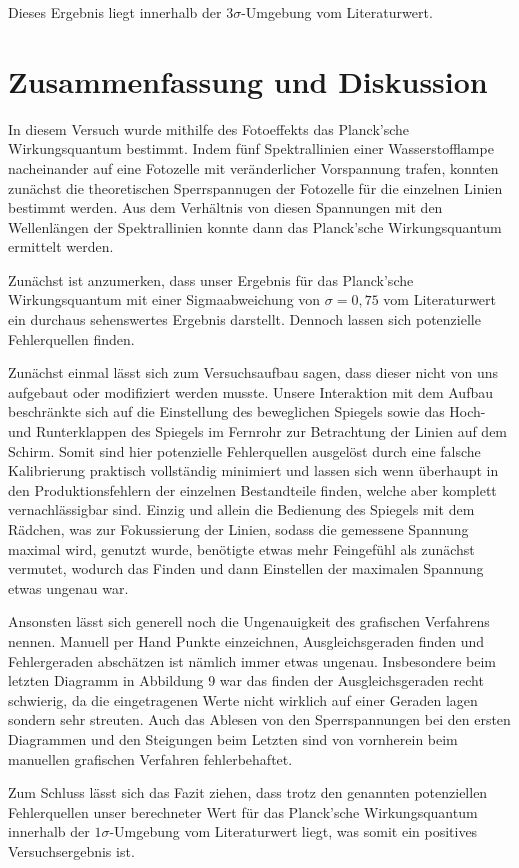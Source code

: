 \documentclass{article}
\begin{document}
Dieses Ergebnis liegt innerhalb der $3\sigma$-Umgebung vom Literaturwert.

\newpage

\section{Zusammenfassung und Diskussion}

In diesem Versuch wurde mithilfe des Fotoeffekts das Planck'sche Wirkungsquantum bestimmt. Indem fünf Spektrallinien einer Wasserstofflampe nacheinander auf eine Fotozelle mit veränderlicher Vorspannung trafen, konnten zunächst die theoretischen Sperrspannugen der Fotozelle für die einzelnen Linien bestimmt werden. Aus dem Verhältnis von diesen Spannungen mit den Wellenlängen der Spektrallinien konnte dann das Planck'sche Wirkungsquantum ermittelt werden.

Zunächst ist anzumerken, dass unser Ergebnis für das Planck'sche Wirkungsquantum mit einer Sigmaabweichung von $\sigma = 0,75$ vom Literaturwert ein durchaus sehenswertes Ergebnis darstellt. Dennoch lassen sich potenzielle Fehlerquellen finden.

Zunächst einmal lässt sich zum Versuchsaufbau sagen, dass dieser nicht von uns aufgebaut oder modifiziert werden musste. Unsere Interaktion mit dem Aufbau beschränkte sich auf die Einstellung des beweglichen Spiegels sowie das Hoch- und Runterklappen des Spiegels im Fernrohr zur Betrachtung der Linien auf dem Schirm. Somit sind hier potenzielle Fehlerquellen ausgelöst durch eine falsche Kalibrierung praktisch vollständig minimiert und lassen sich wenn überhaupt in den Produktionsfehlern der einzelnen Bestandteile finden, welche aber komplett vernachlässigbar sind. Einzig und allein die Bedienung des Spiegels mit dem Rädchen, was zur Fokussierung der Linien, sodass die gemessene Spannung maximal wird, genutzt wurde, benötigte etwas mehr Feingefühl als zunächst vermutet, wodurch das Finden und dann Einstellen der maximalen Spannung etwas ungenau war.

Ansonsten lässt sich generell noch die Ungenauigkeit des grafischen Verfahrens nennen. Manuell per Hand Punkte einzeichnen, Ausgleichsgeraden finden und Fehlergeraden abschätzen ist nämlich immer etwas ungenau. Insbesondere beim letzten Diagramm in Abbildung 9 war das finden der Ausgleichsgeraden recht schwierig, da die eingetragenen Werte nicht wirklich auf einer Geraden lagen sondern sehr streuten. Auch das Ablesen von den Sperrspannungen bei den ersten Diagrammen und den Steigungen beim Letzten sind von vornherein beim manuellen grafischen Verfahren fehlerbehaftet. 

Zum Schluss lässt sich das Fazit ziehen, dass trotz den genannten potenziellen Fehlerquellen unser berechneter Wert für das Planck'sche Wirkungsquantum innerhalb der $1\sigma$-Umgebung vom Literaturwert liegt, was somit ein positives Versuchsergebnis ist.   
\end{document}
